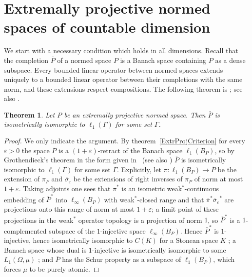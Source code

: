 \documentclass[12pt]{article}
\newtheorem{theorem}{Theorem}[section]
\newcommand{\ellone}[1]{\ell_1(#1)}
\begin{document}
\section{Extremally projective normed spaces of countable
  dimension}\label{SectionMainTheorem}

We start with a necessary condition which holds in all dimensions. Recall that
the completion $\overline{P}$ of a normed space $P$ is a Banach space containing
$P$ as a dense subspace. Every bounded linear operator between normed spaces
extends uniquely to a bounded linear operator between their completions with
the same norm, and these extensions respect compositions. The following
theorem is \cite[proposition 2.3]{HelExtrProjSeqAlg}; see also
\cite[section 3]{GronLiftProbNormSp}.

\begin{theorem}\label{CompletionIsEllOne} Let $P$ be an extremally projective
    normed space. Then $\overline{P}$ is isometrically isomorphic to
    $\ellone{\Gamma}$ for some set $\Gamma$.
\end{theorem}
\begin{proof} We only indicate the argument. By theorem~\ref{ExtrProjCriterion}
    for every $\varepsilon>0$ the space $\overline{P}$ is a
    $(1+\varepsilon)$-retract of the Banach space $\ellone{B_P}$, so by
    Grothendieck's theorem \cite{GrothMetrProjFlatBanSp} in the form given
    in~\cite[section 2]{HelExtrProjSeqAlg} (see also \cite[proposition 3.2]{HelMetrFrQMod})
    $\overline{P}$ is isometrically isomorphic to $\ellone{\Gamma}$ for some
    set $\Gamma$. Explicitly, let $\overline{\pi}:\ellone{B_P}\to\overline{P}$
    be the extension of $\pi_P$ and $\overline{\sigma}_\varepsilon$ be the
    extensions of right inverses of $\pi_P$ of norm at most $1+\varepsilon$.
    Taking adjoints one sees that ${\overline{\pi}}^*$ is an isometric
    weak$^*$-continuous embedding of ${\overline{P}}^*$ into
    $\ell_\infty(B_P)$ with weak$^*$-closed range and that
    ${\overline{\pi}}^*{\overline{\sigma}_\varepsilon}^*$ are projections onto
    this range of norm at most $1+\varepsilon$; a limit point of these
    projections in the weak$^*$ operator topology is a projection of norm
    $1$, so ${\overline{P}}^*$ is a $1$-complemented subspace of the
    $1$-injective space $\ell_\infty(B_P)$. Hence ${\overline{P}}^*$ is
    $1$-injective, hence isometrically isomorphic to $C(K)$ for a Stonean
    space $K$ \cite[chapter 3, \S 11, theorem 6]{LaceyIsomThOfClassicBanSp}; a Banach space
    whose dual is $1$-injective is isometrically isomorphic to some
    $L_1(\Omega,\mu)$ \cite[chapter 7]{LaceyIsomThOfClassicBanSp}; and
    $\overline{P}$ has the Schur property as a subspace of
    $\ellone{B_P}$, which forces $\mu$ to be purely atomic.
\end{proof}
\end{document}
